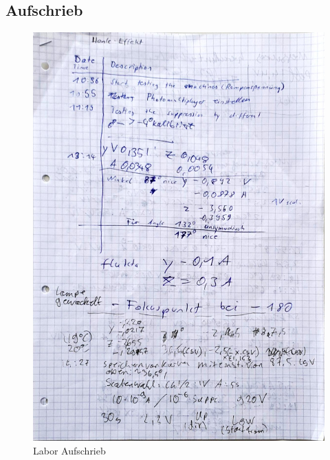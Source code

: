 \subsection{Aufschrieb}

\begin{figure}
	\includegraphics[scale=0.35]{Bild/Lab1}
	\centering
	\caption{Labor Aufschrieb}
\end{figure}
